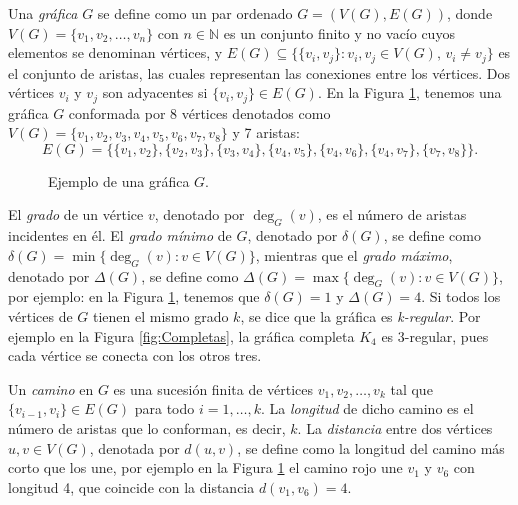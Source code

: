 \documentclass[12pt,titlepage,twoside,openright]{book}
\begin{document}
Una \textit{gr\'afica} $G$ se define como un par ordenado $G = (V(G), E(G))$, donde $V(G)=\{v_1, v_2, \dots, v_n\}$ con $n \in \mathbb{N}$ es un conjunto finito y no vac\'io cuyos elementos se denominan v\'ertices, y $E(G) \subseteq \{ \{v_i,v_j\} : v_i,v_j \in V(G),\, v_i \neq v_j \}$ es el conjunto de aristas, las cuales representan las conexiones entre los v\'ertices. Dos v\'ertices $v_i$ y $v_j$ son adyacentes si $\{v_i,v_j\} \in E(G)$. En la Figura \ref{EjemG}, tenemos una gr\'afica $G$ conformada por 8 v\'ertices denotados como $V(G)=\{v_1,v_2,v_3,v_4,v_5,v_6,v_7,v_8\}$ y 7 aristas: $$E(G)=\{\{v_1,v_2\}, \{v_2,v_3\}, \{v_3,v_4\}, \{v_4,v_5\},\{v_4,v_6\},\{v_4,v_7\},\{v_7,v_8\}\}.$$ 
\begin{figure}[h]
\centering
{}
\caption{Ejemplo de una gr\'afica $G$.}
\label{EjemG}
\end{figure}
El \textit{grado} de un v\'ertice $v$, denotado por $\deg_G(v)$, es el n\'umero de aristas incidentes en \'el. El \textit{grado m\'inimo} de $G$, denotado por $\delta(G)$, se define como $\delta(G) = \min\{\deg_G(v) : v \in V(G)\}$, mientras que el \textit{grado m\'aximo}, denotado por $\Delta(G)$, se define como $\Delta(G) = \max\{\deg_G(v) : v \in V(G)\}$, por ejemplo: en la Figura \ref{EjemG}, tenemos que $\delta(G)=1$ y $\Delta(G)=4$. Si todos los v\'ertices de $G$ tienen el mismo grado $k$, se dice que la gr\'afica es \textit{k-regular}. Por ejemplo en la Figura \ref{fig:Completas}, la gr\'afica completa $K_4$ es $3$-regular, pues cada v\'ertice se conecta con los otros tres.

Un \textit{camino} en $G$ es una sucesi\'on finita de v\'ertices $v_1, v_2, \ldots, v_k$ tal que $\{v_{i-1}, v_i\} \in E(G)$ para todo $i = 1, \ldots, k$. La \textit{longitud} de dicho camino es el n\'umero de aristas que lo conforman, es decir, $k$. La \textit{distancia} entre dos v\'ertices $u,v \in V(G)$, denotada por $d(u,v)$, se define como la longitud del camino m\'as corto que los une, por ejemplo en la Figura \ref{EjemG} el camino rojo une $v_1$ y $v_6$ con longitud 4, que coincide con la distancia $d(v_1,v_6)=4$.
\end{document}

